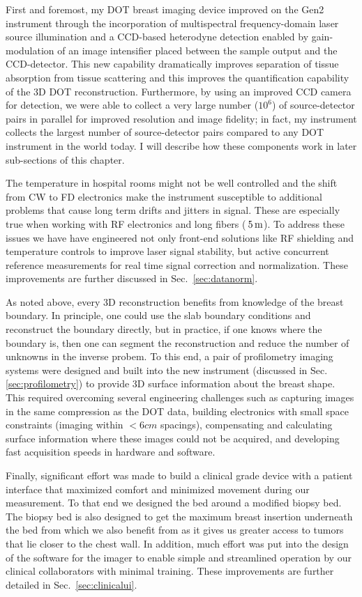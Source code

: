 First and foremost, my DOT breast imaging device improved on the Gen2 instrument through the incorporation of multispectral frequency-domain laser source illumination and a CCD-based heterodyne detection enabled by gain-modulation of an image intensifier placed between the sample output and the CCD-detector. This new capability dramatically improves separation of tissue absorption from tissue scattering and this improves the quantification capability of the 3D DOT reconstruction. Furthermore, by using an improved CCD camera for detection, we were able to collect a very large number ($10^6$) of source-detector pairs in parallel for improved resolution and image fidelity; in fact, my instrument collects the largest number of source-detector pairs compared to any DOT instrument in the world today. I will describe how these components work in later sub-sections of this chapter.

The temperature in hospital rooms might not be well controlled and the shift from CW to FD electronics make the instrument susceptible to additional problems that cause long term drifts and jitters in signal. These are especially true when working with RF electronics and long fibers ($\>5\,{\rm m}$). To address these issues we have have engineered not only front-end solutions like RF shielding and temperature controls to improve laser signal stability, but active concurrent reference measurements for real time signal correction and normalization. These improvements are further discussed in Sec.~\ref{sec:datanorm}.

As noted above, every 3D reconstruction benefits from knowledge of the breast boundary. In principle, one could use the slab boundary conditions and reconstruct the boundary directly, but in practice, if one knows where the boundary is, then one can segment the reconstruction and reduce the number of unknowns in the inverse probem. To this end, a pair of profilometry imaging systems were designed and built into the new instrument (discussed in Sec. \ref{sec:profilometry}) to provide 3D surface information about the breast shape. This required overcoming several engineering challenges such as capturing images in the same compression as the DOT data, building electronics with small space constraints (imaging within $<6cm$ spacings), compensating and calculating surface information where these images could not be acquired, and developing fast acquisition speeds in hardware and software.

Finally, significant effort was made to build a clinical grade device with a patient interface that maximized comfort and minimized movement during our measurement. To that end we designed the bed around a modified biopsy bed. The biopsy bed is also designed to get the maximum breast insertion underneath the bed from which we also benefit from as it gives us greater access to tumors that lie closer to the chest wall. In addition, much effort was put into the design of the software for the imager to enable simple and streamlined operation by our clinical collaborators with minimal training. These improvements are further detailed in Sec.~\ref{sec:clinicalui}.

